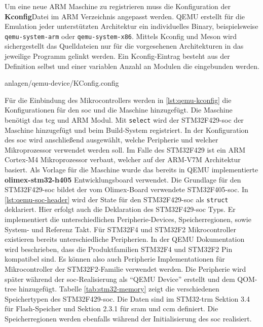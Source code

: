 Um eine neue ARM Maschine zu registrieren muss die Konfiguration der
\textbf{Kconfig}\footnotemark[2] Datei im ARM Verzeichnis angepasst werden.
QEMU erstellt für die Emulation jeder unterstützten Architektur ein
individuelles Binary, beispielsweise \texttt{qemu-system-arm} oder
\texttt{qemu-system-x86}.
Mittels Kconfig und Meson wird sichergestellt das Quelldateien nur für die
vorgesehenen Architekturen in das jeweilige Programm gelinkt werden.
Ein Kconfig-Eintrag besteht aus der Definition selbst und einer variablen
Anzahl an Modulen die eingebunden werden.


\begin{minipage}{\linewidth}

                {anlagen/qemu-device/KConfig.config}
\end{minipage}

Für die Einbindung des Mikrocontrollers werden in \ref{lst:qemu-kconfig} die
Konfigurationen für den \ac{soc} und die Maschine hinzugefügt.
Die Maschine benötigt das \ac{tcg} und ARM Modul.
Mit \texttt{select} wird der STM32F429-\ac{soc} der Maschine hinzugefügt und
beim Build-System registriert.
In der Konfiguration des \ac{soc} wird anschließend ausgewählt, welche
Peripherie und welcher Mikroprozessor verwendet werden soll.
Im Falle des STM32F429 ist ein ARM Cortex-M4 Mikroprozessor verbaut, welcher
auf der ARM-V7M Architektur basiert.
Als Vorlage für die Maschine wurde das bereits in QEMU implementierte
\textbf{olimex-stm32-h405} Entwicklungsboard verwendet\cite{QemuOlimexBoard}.
Die Grundlage für den STM32F429-\ac{soc} bildet der vom Olimex-Board verwendete
STM32F405-\ac{soc}\cite{QemuStmF405Soc}.
\newline
In \ref{lst:qemu-soc-header} wird der State für den STM32F429-\ac{soc} als
\texttt{struct} deklariert.
Hier erfolgt auch die Deklaration des STM32F429-\ac{soc} Typs.
Er implementiert die unterschiedlichen Peripherie-Devices, Speicherregionen,
sowie System- und Referenz Takt.
Für STM32F4 und STM32F2 Mikrocontroller existieren bereits unterschiedliche
Peripherien.
In der QEMU Dokumentation wird beschrieben, dass die Produktfamilien STM32F4
und STM32F2 Pin kompatibel sind.
Es können also auch Peripherie Implementationen für Mikrocontroller der
STM32F2-Familie verwendet werden.
Die Peripherie wird später während der \ac{soc}-Realisierung als \enquote{QEMU
Device} erstellt und dem QOM-tree hinzugefügt.
\newline
Tabelle \ref{tab:stm32-memory} zeigt die verschiedenen Speichertypen des
STM32F429-\ac{soc}.
Die Daten sind im STM32-\ac{trm} Sektion 3.4 für Flash-Speicher und Sektion
2.3.1 für \ac{sram} und \ac{ccm} definiert\cite{Stm32F4Trm}.
Die Speicherregionen werden ebenfalls während der Initialisierung des \ac{soc}
realisiert.

